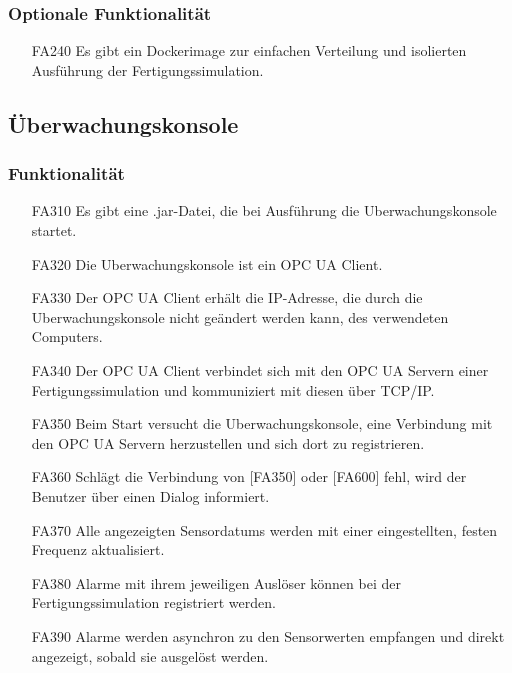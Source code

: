 \documentclass[parskip=full]{scrartcl}
\begin{document}
\subsubsection{Optionale Funktionalität}
\label{fertigung-optional}
\begin{enumerate}
\item[FA240] Es gibt ein \gls{Dockerimage} zur einfachen Verteilung und isolierten Ausführung der Fertigungssimulation.
\end{enumerate}

\subsection{Überwachungskonsole}
\subsubsection{Funktionalität}
\begin{enumerate}
\item[FA310] Es gibt eine .jar-Datei, die bei Ausführung die \gls{Uberwachungskonsole} startet.
\item[FA320] Die \gls{Uberwachungskonsole} ist ein OPC UA Client.
\item[FA330] Der OPC UA Client erhält die IP-Adresse, die durch die \gls{Uberwachungskonsole} nicht geändert werden kann, des verwendeten Computers.
\item[FA340] Der OPC UA Client verbindet sich mit den OPC UA Servern einer Fertigungssimulation und kommuniziert mit diesen über TCP/IP.
\item[FA350] Beim Start versucht die \gls{Uberwachungskonsole}, eine Verbindung mit den OPC UA Servern herzustellen und sich dort zu registrieren.
\item[FA360] Schlägt die Verbindung von [FA350] oder [FA600] fehl, wird der Benutzer über einen Dialog informiert.
\item[FA370] Alle angezeigten \glspl{Sensordatum} werden mit einer eingestellten, festen Frequenz aktualisiert.
\item[FA380] Alarme mit ihrem jeweiligen Auslöser können bei der Fertigungssimulation registriert werden.
\item[FA390] Alarme werden asynchron zu den Sensorwerten empfangen und direkt angezeigt, sobald sie ausgelöst werden.
\end{enumerate}
\end{document}
